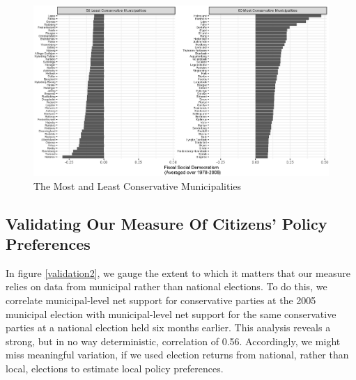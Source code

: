 \documentclass[a4paper,12pt]{article}
\begin{document}
\begin{figure}
	\centering
	\includegraphics[width=1\textwidth]{socialdemocratism.eps}
	\caption{The Most and Least Conservative Municipalities} \label{mostleast}
\end{figure}

\clearpage


\subsection{Validating Our Measure Of Citizens' Policy Preferences} \label{validation}
In figure \ref{validation2}, we gauge the extent to which it matters that our measure relies on data from municipal rather than national elections. To do this, we correlate  municipal-level net support for conservative parties at the 2005 municipal election with municipal-level net support for the same conservative parties at a national election held six months earlier. This analysis reveals a strong, but in no way deterministic, correlation of 0.56. Accordingly, we might miss meaningful variation, if we used election returns from national, rather than local, elections to estimate local policy preferences.
\end{document}
